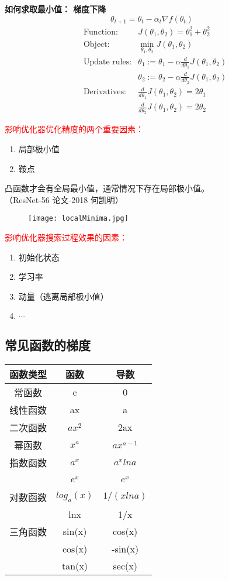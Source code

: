 \textbf{如何求取最小值： 梯度下降}$$\theta_{t+1} = \theta_t-\alpha_t\nabla f(\theta_t)$$
\begin{align*}
&\text{Function}:&J(\theta_1, \theta_2)=\theta_1^2+\theta_2^2~~~~~~\\
&\text{Object}:&\min\limits_{\theta_1,\theta_2}J(\theta_1, \theta_2)~~~~~~~~~~~~\\
&\text{Update~rules}:&\theta_1:=\theta_1-\alpha\frac{d}{d\theta_1}J(\theta_1, \theta_2)\\
&~            &\theta_2:=\theta_2-\alpha\frac{d}{d\theta_2}J(\theta_1, \theta_2)\\
&\text{Derivatives}:&\frac{d}{d\theta_1}J(\theta_1, \theta_2)=2\theta_1~~~~~~\\
&~                  &\frac{d}{d\theta_2}J(\theta_1, \theta_2)=2\theta_2~~~~~~
\end{align*}

\textcolor{red}{影响优化器优化精度的两个重要因素：}
\begin{enumerate}
  \item 局部极小值
  \item 鞍点
\end{enumerate}

凸函数才会有全局最小值，通常情况下存在局部极小值。\\
（ResNet-56 论文-2018 何凯明）
\begin{figure}[!h]
  \centering
  \texttt{[image: localMinima.jpg]}
\end{figure}

\textcolor{red}{影响优化器搜索过程效果的因素：}
\begin{enumerate}
  \item 初始化状态
  \item 学习率
  \item 动量（逃离局部极小值）
  \item $\cdots$
\end{enumerate}


\subsection{常见函数的梯度}
\begin{tabular}{|c|c|c|}
\hline
函数类型& 函数& 导数\\
\hline
常函数& c& 0\\
\hline
线性函数& ax& a\\
\hline
二次函数& $ax^2$&2ax\\
\hline
幂函数&$x^a$&$ax^{a-1}$\\
\hline
指数函数&$a^x$&$a^xlna$\\
~&$e^x$&$e^x$\\
\hline
对数函数&$log_a(x)$&$1/(xlna)$\\
~&lnx&1/x\\
\hline
三角函数&sin(x)&cos(x)\\
~&cos(x)&-sin(x)\\
~&tan(x)&sec(x)\\
\hline
\end{tabular}
    ~\\

